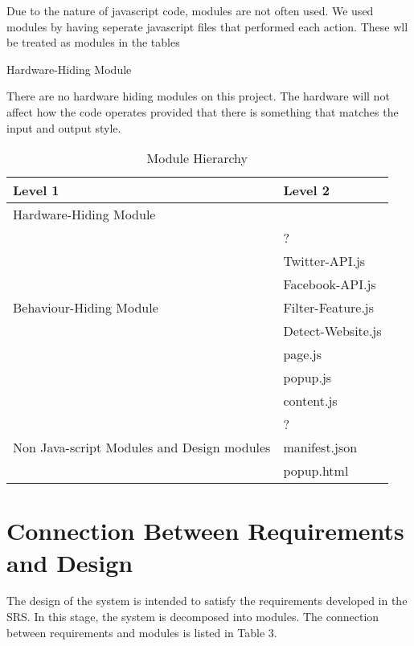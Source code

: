 \documentclass[12pt, titlepage]{article}
\newcounter{mnum}
\newcommand{\mthemnum}{M\themnum}
\begin{document}
Due to the nature of javascript code, modules are not often used. We used modules by having seperate javascript files that performed each action. These wll be treated as modules in the tables
\begin{description}
\item [ \mthemnum \label{mHH}:] Hardware-Hiding Module
\item There are no hardware hiding modules on this project. The hardware will not affect how the code operates provided that there is something that matches the input and output style. 
\end{description}
\begin{table}[h!]
\centering
\begin{tabular}{p{} p{}}
\toprule
\textbf{Level 1} & \textbf{Level 2}\\
\midrule
{Hardware-Hiding Module} & ~ \\
\midrule
\multirow{7}{0.3\textwidth}{Behaviour-Hiding Module} & ?\\ %
& Twitter-API.js\\
& Facebook-API.js\\
&Filter-Feature.js\\
&Detect-Website.js\\
& page.js\\
& popup.js\\
& content.js\\
\midrule
\multirow{3}{0.3\textwidth}{Non Java-script Modules and Design modules} & {?}\\ %
& manifest.json\\
& popup.html \\
\bottomrule
\end{tabular}
\caption{Module Hierarchy}
\label{TblMH}
\end{table}
\section{Connection Between Requirements and Design} \label{SecConnection}
The design of the system is intended to satisfy the requirements developed in
the SRS. In this stage, the system is decomposed into modules. The connection
between requirements and modules is listed in Table 3.
\end{document}
